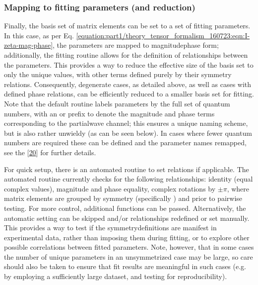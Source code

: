 \documentclass[letterpaper,table,10pt,english]{jupyterBook}
\begin{document}
\subsubsection{Mapping to fitting parameters (and reduction)}
\label{\detokenize{part2/sym-fitting-intro_240723:mapping-to-fitting-parameters-and-reduction}}\label{\detokenize{part2/sym-fitting-intro_240723:sec-basis-sets-remapping-to-fittingparams}}
\sphinxAtStartPar
Finally, the basis set of matrix elements can be set to a set of fitting parameters. In this case, as per Eq. \eqref{equation:part1/theory_tensor_formalism_160723:eqn:I-zeta-mag-phase}, the parameters are mapped to magnitude\sphinxhyphen{}phase form; additionally, the fitting routine allows for the definition of relationships between the parameters. This provides a way to reduce the effective size of the basis set to only the unique values, with other terms defined purely by their symmetry relations. Consequently, degenerate cases, as detailed above, as well as cases with defined phase relations, can be efficiently reduced to a smaller basis set for fitting. Note that the default routine labels parameters by the full set of quantum numbers, with an  or  prefix to denote the magnitude and phase terms corresponding to the partial\sphinxhyphen{}wave channel; this ensures a unique naming scheme, but is also rather unwieldy (as can be seen below). In cases where fewer quantum numbers are required these can be defined and the parameter names remapped, see the  {[}\hyperlink{cite.backmatter/bibliography:id680}{20}{]} for further details.

\sphinxAtStartPar
For quick setup, there is an automated routine to set relations if applicable. The automated routine currently checks for the following relationships: identity (equal complex values), magnitude and phase equality, complex rotations by \(\pm\pi\), where matrix elements are grouped by symmetry (specifically ) and  prior to pair\sphinxhyphen{}wise testing. For more control, additional functions can be passed. Alternatively, the automatic setting can be skipped and/or relationships redefined or set manually. This provides a way to test if the symmetry\sphinxhyphen{}definitions are manifest in experimental data, rather than imposing them during fitting, or to explore other possible correlations between fitted parameters. Note, however, that in some cases the number of unique parameters in an unsymmetrized case may be large, so care should also be taken to ensure that fit results are meaningful in such cases (e.g. by employing a sufficiently large dataset, and testing for reproducibility).
\end{document}
